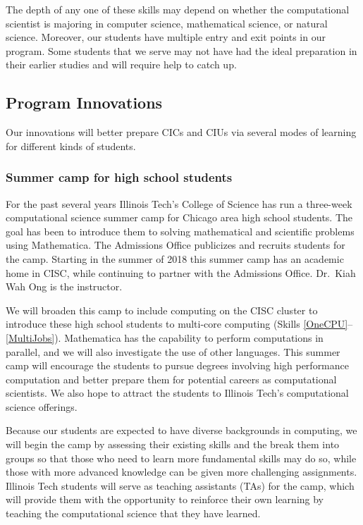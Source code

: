 \documentclass[11pt]{NSFamsart}
\begin{document}
The depth of any one of these skills may depend on whether the computational scientist is majoring in computer science, mathematical science, or natural science.  Moreover, our students have multiple entry and exit points in our program.  Some students that we serve may not have had the ideal preparation in their earlier studies and will require help to catch up.


\subsection{Program Innovations}
Our innovations will better prepare CICs and CIUs via several modes of learning for different kinds of students.

\subsubsection*{Summer camp for high school students} For the past several years Illinois Tech's College of Science has run a three-week computational science summer camp for Chicago area high school students.  The goal has been to introduce them to solving mathematical and scientific problems using Mathematica.  The Admissions Office publicizes and recruits students for the camp.  Starting in the summer of 2018 this summer camp has an academic home in CISC, while continuing to partner with the Admissions Office.  Dr.\ Kiah Wah Ong is the instructor.

We will broaden this camp to include computing on the CISC cluster to introduce these high school students to multi-core computing (Skills \ref{OneCPU}--\ref{MultiJobs}).  Mathematica has the capability to perform computations in parallel, and we will also investigate the use of other languages.  This summer camp will encourage the students to pursue degrees involving high performance computation and better prepare them for potential careers as computational scientists.  We also hope to attract the students to Illinois Tech's computational science offerings.  

Because our students are expected to have diverse backgrounds in computing, we will begin the camp by assessing their existing skills and the break them into groups so that those who need to learn more fundamental skills may do so, while those with more advanced knowledge can be given more challenging assignments.  Illinois Tech students will serve as teaching assistants (TAs) for the camp, which will provide them with the opportunity to reinforce their own learning by teaching the computational science that they have learned. 
\end{document}
